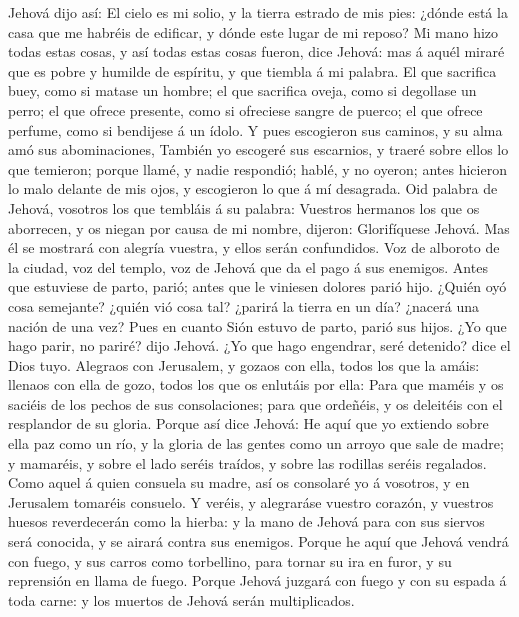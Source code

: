  Jehová dijo así: El cielo es mi solio, y la tierra estrado
de mis pies: ¿dónde está la casa que me habréis de edificar, y dónde
este lugar de mi reposo?  Mi mano hizo todas estas cosas, y
así todas estas cosas fueron, dice Jehová: mas á aquél miraré que es
pobre y humilde de espíritu, y que tiembla á mi palabra.  El
que sacrifica buey, como si matase un hombre; el que sacrifica oveja,
como si degollase un perro; el que ofrece presente, como si ofreciese
sangre de puerco; el que ofrece perfume, como si bendijese á un ídolo. Y
pues escogieron sus caminos, y su alma amó sus abominaciones,
 También yo escogeré sus escarnios, y traeré sobre ellos lo
que temieron; porque llamé, y nadie respondió; hablé, y no oyeron; antes
hicieron lo malo delante de mis ojos, y escogieron lo que á mí
desagrada.  Oid palabra de Jehová, vosotros los que tembláis
á su palabra: Vuestros hermanos los que os aborrecen, y os niegan por
causa de mi nombre, dijeron: Glorifíquese Jehová. Mas él se mostrará con
alegría vuestra, y ellos serán confundidos.  Voz de alboroto
de la ciudad, voz del templo, voz de Jehová que da el pago á sus
enemigos.  Antes que estuviese de parto, parió; antes que le
viniesen dolores parió hijo.  ¿Quién oyó cosa semejante?
¿quién vió cosa tal? ¿parirá la tierra en un día? ¿nacerá una nación de
una vez? Pues en cuanto Sión estuvo de parto, parió sus hijos.
 ¿Yo que hago parir, no pariré? dijo Jehová. ¿Yo que hago
engendrar, seré detenido? dice el Dios tuyo.  Alegraos con
Jerusalem, y gozaos con ella, todos los que la amáis: llenaos con ella
de gozo, todos los que os enlutáis por ella:  Para que
maméis y os saciéis de los pechos de sus consolaciones; para que
ordeñéis, y os deleitéis con el resplandor de su gloria. 
Porque así dice Jehová: He aquí que yo extiendo sobre ella paz como un
río, y la gloria de las gentes como un arroyo que sale de madre; y
mamaréis, y sobre el lado seréis traídos, y sobre las rodillas seréis
regalados.  Como aquel á quien consuela su madre, así os
consolaré yo á vosotros, y en Jerusalem tomaréis consuelo. 
Y veréis, y alegraráse vuestro corazón, y vuestros huesos reverdecerán
como la hierba: y la mano de Jehová para con sus siervos será conocida,
y se airará contra sus enemigos.  Porque he aquí que Jehová
vendrá con fuego, y sus carros como torbellino, para tornar su ira en
furor, y su reprensión en llama de fuego.  Porque Jehová
juzgará con fuego y con su espada á toda carne: y los muertos de Jehová
serán multiplicados.

